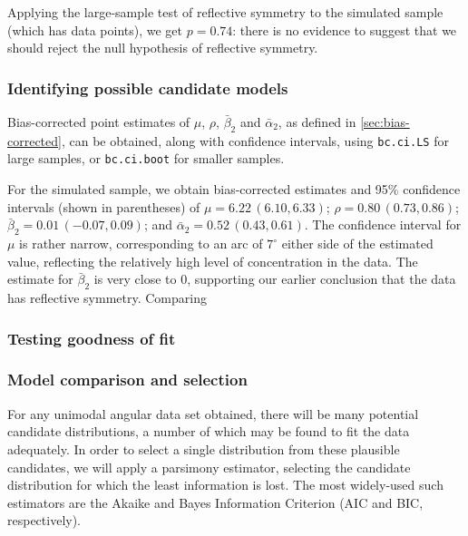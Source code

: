 \documentclass[../../ArchStats.tex]{subfiles}
\begin{document}
Applying the large-sample test of reflective symmetry to the simulated sample (which has  data points), we get $p = 0.74$: there is no evidence to suggest that we should reject the null hypothesis of reflective symmetry.


\subsubsection{Identifying possible candidate models}

Bias-corrected point estimates of $\mu$, $\rho$, $\bar{\beta}_2$ and $\bar{\alpha}_2$, as defined in \ref{sec:bias-corrected}, can be obtained, along with confidence intervals,  using \texttt{bc.ci.LS} for large samples, or \texttt{bc.ci.boot} for smaller samples.

For the simulated sample, we obtain bias-corrected estimates and 95\% confidence intervals (shown in parentheses) of $\mu = 6.22 \,(6.10, 6.33)$; $\rho = 0.80 \,(0.73, 0.86)$; $\bar{\beta}_2 = 0.01 \,(-0.07, 0.09)$; and $\bar{\alpha}_2 = 0.52 \,(0.43, 0.61)$. The confidence interval for $\mu$ is rather narrow, corresponding to an arc of $7^\circ$ either side of the estimated value, reflecting the relatively high level of concentration in the data. The estimate for $\bar{\beta}_2$ is very close to 0, supporting our earlier conclusion that the data has reflective symmetry. Comparing 


\subsubsection{Testing goodness of fit}

\subsubsection{Model comparison and selection}

For any unimodal angular data set obtained, there will be many potential candidate distributions, a number of which may be found to fit the data adequately. In order to select a single distribution from these plausible candidates, we will apply a parsimony estimator, selecting the candidate distribution for which the least information is lost. The most widely-used such estimators are the Akaike and Bayes Information Criterion (AIC and BIC, respectively).
\end{document}
